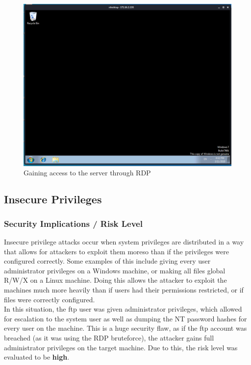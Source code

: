 \documentclass{report}
\begin{document}
\begin{figure}[!htb]
	\centering
	\includegraphics[scale=0.4]{img/rdp2.png}
	\caption{Gaining access to the server through RDP}
\end{figure}
\pagebreak

\subsection{Insecure Privileges}
\subsubsection{Security Implications / Risk Level}
Insecure privilege attacks occur when system privileges are distributed in a way that allows for attackers to exploit them moreso than if the privileges were configured correctly. Some examples of this include giving every user administrator privileges on a Windows machine, or making all files global R/W/X on a Linux machine. Doing this allows the attacker to exploit the machines much more heavily than if users had their permissions restricted, or if files were correctly configured.\\
In this situation, the ftp user was given administrator privileges, which allowed for escalation to the system user as well as dumping the NT password hashes for every user on the machine. This is a huge security flaw, as if the ftp account was breached (as it was using the RDP bruteforce), the attacker gains full administrator privileges on the target machine. Due to this, the risk level was evaluated to be \textbf{high}.
\end{document}
